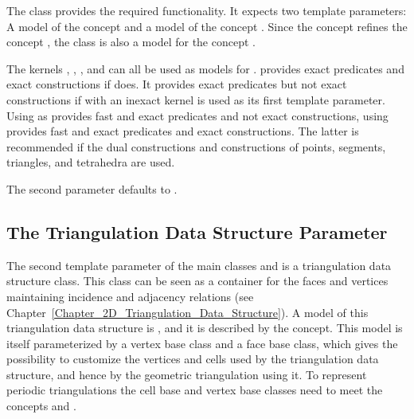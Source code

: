 The class
provides the required functionality. It expects two template
parameters: A model of the concept 
and a model of the concept . Since the concept
 refines the concept
, the class
is also a model for the concept .

The kernels , ,
,  and
 can all be used as models for
.  provides exact
predicates and exact constructions if  does. It provides
exact predicates but not exact constructions if
 with  an inexact kernel is used as
its first template parameter. Using
 as
 provides fast and exact predicates and not exact
constructions, using
 provides
fast and exact predicates and exact constructions. The latter is
recommended if the dual constructions and constructions of points,
segments, triangles, and tetrahedra are used.

The second parameter  defaults to
.

\subsection{The Triangulation Data Structure Parameter\label{P2Triangulation2-sec-tds}}

The second template parameter of the main classes
 and
 is a
triangulation data structure class.  This class can be seen as a container for
the faces and vertices maintaining incidence and adjacency relations (see
Chapter~\ref{Chapter_2D_Triangulation_Data_Structure}).  A model of this triangulation data structure is
, and it is described by the
 concept.  This model is itself
parameterized by a vertex base class and a face base class, which gives the
possibility to customize the vertices and cells used by the triangulation data
structure, and hence by the geometric triangulation using it.
To represent periodic triangulations the cell base and vertex base
classes need to meet the concepts
 and
.

